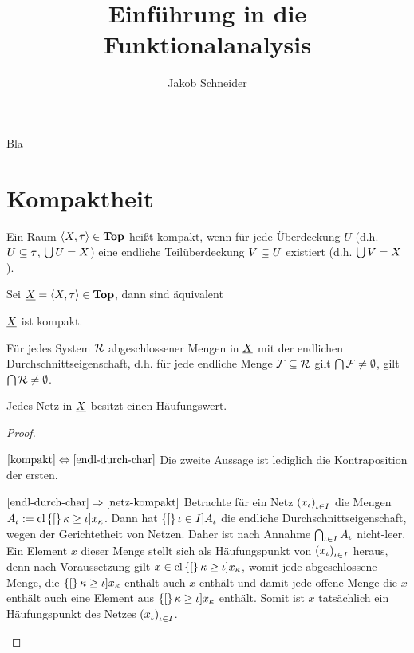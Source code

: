 \documentclass{book}
\begin{document}
\title{Einführung in die Funktionalanalysis}
\author{Jakob Schneider}
\pagestyle{empty}
\maketitle
\clearpage

\begin{definition}
    Bla
\end{definition}

\section{Kompaktheit}

\begin{definition}[kompakt]
    Ein Raum $\struct{X,\tau}\in\Top$ heißt kompakt, wenn für jede Überdeckung $U$ (d.h. $U\subseteq\tau$, $\bigcup U=X$) eine endliche Teilüberdeckung $V\subseteq U$ existiert (d.h. $\bigcup V=X$).
\end{definition}

\begin{theorem}
    Sei $\uX=\struct{X,\tau}\in\Top$, dann sind äquivalent
    \begin{statements}
            \item\label{kompakt} $\underline{X}$ ist kompakt.
            \item\label{endl-durch-char} Für jedes System $\mathcal{R}$ abgeschlossener Mengen in $\underline{X}$ mit der endlichen Durchschnittseigenschaft, d.h. für jede endliche Menge $\mathcal{F}\subseteq \mathcal{R}$ gilt $\bigcap\mathcal{F}\neq\emptyset$, gilt $\bigcap\mathcal{R}\neq\emptyset$.
            \item\label{netz-kompakt} Jedes Netz in $\underline{X}$ besitzt einen Häufungswert.
    \end{statements}
\end{theorem}

\begin{proof}
    \begin{implications}
            \item[$\autoref{kompakt}\equiv\autoref{endl-durch-char}$] Die zweite Aussage ist lediglich die Kontraposition der ersten.
            \item[$\autoref{endl-durch-char}\implies\autoref{netz-kompakt}$] Betrachte für ein Netz $\net[\iota\in I]{x_{\iota}}$ die Mengen $A_{\iota}:=\cl\set[\kappa\geq \iota]{x_\kappa}$. Dann hat $\set[\iota\in I]{A_{\iota}}$ die endliche Durchschnittseigenschaft, wegen der Gerichtetheit von Netzen. Daher ist nach Annahme $\bigcap_{\iota\in I}{A_{\iota}}$ nicht-leer. Ein Element $x$ dieser Menge stellt sich als Häufungspunkt von $\net[\iota\in I]{x_{\iota}}$ heraus, denn nach Voraussetzung gilt $x\in\cl\set[\kappa\geq \iota]{x_{\kappa}}$, womit jede abgeschlossene Menge, die $\set[\kappa\geq \iota]{x_{\kappa}}$ enthält auch $x$ enthält und damit jede offene Menge die $x$ enthält auch eine Element aus $\set[\kappa\geq\iota]{x_{\kappa}}$ enthält. Somit ist $x$ tatsächlich ein Häufungspunkt des Netzes $\net[\iota\in I]{x_{\iota}}$.
    \end{implications}
\end{proof}
\end{document}
